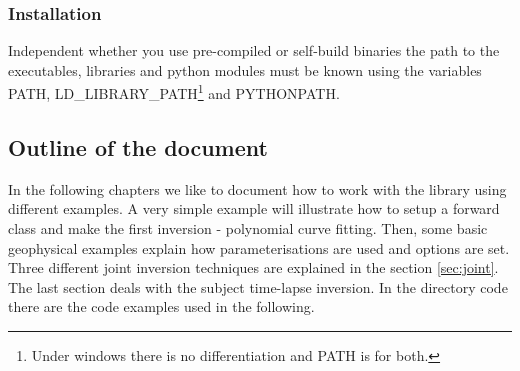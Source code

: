 \subsubsection*{Installation}
Independent whether you use pre-compiled or self-build binaries the path to the executables, libraries and python modules must be known using the variables PATH, LD\_LIBRARY\_PATH\footnote{Under windows there is no differentiation and PATH is for both.} and PYTHONPATH.

\subsection{Outline of the document}\label{sec:overview}
In the following chapters we like to document how to work with the library using different examples.
A very simple example will illustrate how to setup a forward class and make the first inversion - polynomial curve fitting.
Then, some basic geophysical examples explain how parameterisations are used and options are set.
Three different joint inversion techniques are explained in the section \ref{sec:joint}.
The last section deals with the subject time-lapse inversion.
In the directory code there are the code examples used in the following.
